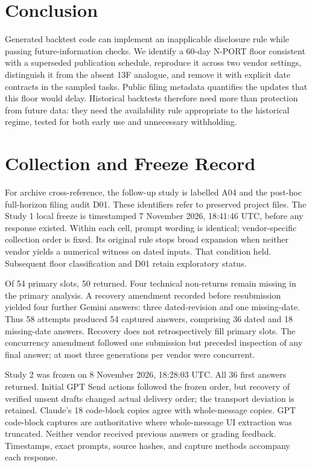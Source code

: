 \documentclass[10pt,twocolumn,a4paper]{article}
\begin{document}
\section{Conclusion}
Generated backtest code can implement an inapplicable disclosure rule while passing future-information checks. We identify a 60-day N-PORT floor consistent with a superseded publication schedule, reproduce it across two vendor settings, distinguish it from the absent 13F analogue, and remove it with explicit date contracts in the sampled tasks. Public filing metadata quantifies the updates that this floor would delay. Historical backtests therefore need more than protection from future data: they need the availability rule appropriate to the historical regime, tested for both early use and unnecessary withholding.

\begingroup
\small\sloppy\setlength{\bibsep}{2pt}


\endgroup
\appendix
\small

\section{Collection and Freeze Record}
\label{app:collection}
For archive cross-reference, the follow-up study is labelled A04 and the post-hoc full-horizon filing audit D01. These identifiers refer to preserved project files.
The Study 1 local freeze is timestamped 7 November 2026, 18:41:46 UTC, before any response existed. Within each cell, prompt wording is identical; vendor-specific collection order is fixed. Its original rule stops broad expansion when neither vendor yields a numerical witness on dated inputs. That condition held. Subsequent floor classification and D01 retain exploratory status.

Of 54 primary slots, 50 returned. Four technical non-returns remain missing in the primary analysis. A recovery amendment recorded before resubmission yielded four further Gemini answers: three dated-revision and one missing-date. Thus 58 attempts produced 54 captured answers, comprising 36 dated and 18 missing-date answers. Recovery does not retrospectively fill primary slots. The concurrency amendment followed one submission but preceded inspection of any final answer; at most three generations per vendor were concurrent.

Study 2 was frozen on 8 November 2026, 18:28:03 UTC. All 36 first answers returned. Initial GPT Send actions followed the frozen order, but recovery of verified unsent drafts changed actual delivery order; the transport deviation is retained. Claude's 18 code-block copies agree with whole-message copies. GPT code-block captures are authoritative where whole-message UI extraction was truncated. Neither vendor received previous answers or grading feedback. Timestamps, exact prompts, source hashes, and capture methods accompany each response.
\end{document}
